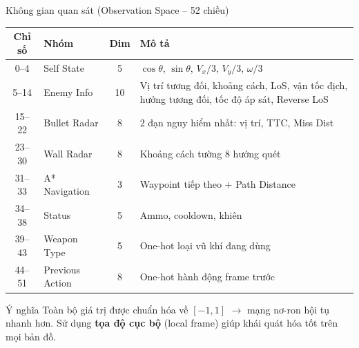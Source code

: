 \documentclass[aspectratio=169, 11pt]{beamer}
\begin{document}
\begin{frame}{Không gian quan sát (Observation Space -- 52 chiều)}
  \begin{center}
    \small
    \renewcommand{\arraystretch}{1.15}
    \begin{tabular}{c l c p{6.5cm}}
      \toprule
      \textbf{Chỉ số} & \textbf{Nhóm} & \textbf{Dim} & \textbf{Mô tả} \\
      \midrule
      0--4   & Self State       & 5  & $\cos\theta$, $\sin\theta$, $V_x/3$, $V_y/3$, $\omega/3$ \\
      5--14  & Enemy Info       & 10 & Vị trí tương đối, khoảng cách, LoS, vận tốc địch, hướng tương đối, tốc độ áp sát, Reverse LoS \\
      15--22 & Bullet Radar     & 8  & 2 đạn nguy hiểm nhất: vị trí, TTC, Miss Dist \\
      23--30 & Wall Radar       & 8  & Khoảng cách tường 8 hướng quét \\
      31--33 & A* Navigation    & 3  & Waypoint tiếp theo + Path Distance \\
      34--38 & Status           & 5  & Ammo, cooldown, khiên \\
      39--43 & Weapon Type      & 5  & One-hot loại vũ khí đang dùng \\
      44--51 & Previous Action  & 8  & One-hot hành động frame trước \\
      \bottomrule
    \end{tabular}
  \end{center}

  \vspace{4pt}
  \begin{exampleblock}{Ý nghĩa}
    Toàn bộ giá trị được chuẩn hóa về $[-1, 1]$ $\rightarrow$ mạng nơ-ron hội tụ nhanh hơn. Sử dụng \textbf{tọa độ cục bộ} (local frame) giúp khái quát hóa tốt trên mọi bản đồ.
  \end{exampleblock}
\end{frame}
\end{document}
